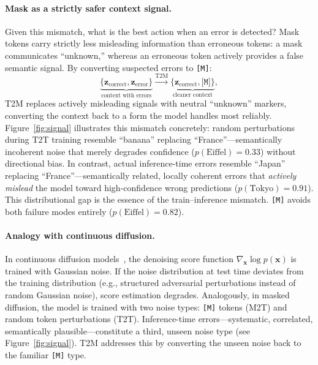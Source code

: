 \documentclass{article}
\newcommand{\mask}{\texttt{[M]}}
\newcommand{\MtoT}{\textrm{M2T}}
\newcommand{\TtoT}{\textrm{T2T}}
\newcommand{\TtoM}{\textrm{T2M}}
\begin{document}
\paragraph{Mask as a strictly safer context signal.} Given this mismatch, what is the best action when an error is detected? Mask tokens carry strictly less misleading information than erroneous tokens: a mask communicates ``unknown,'' whereas an erroneous token actively provides a false semantic signal. By converting suspected errors to \mask{}:
\begin{equation}
    \underbrace{\{\mathbf{z}_{\text{correct}}, \mathbf{z}_{\text{error}}\}}_{\text{context with errors}} \xrightarrow{\text{T2M}} \underbrace{\{\mathbf{z}_{\text{correct}}, \mask{}\}}_{\text{cleaner context}},
\end{equation}
\TtoM{} replaces actively misleading signals with neutral ``unknown'' markers, converting the context back to a form the model handles most reliably. Figure~\ref{fig:signal} illustrates this mismatch concretely: random perturbations during \TtoT{} training resemble ``banana'' replacing ``France''---semantically incoherent noise that merely degrades confidence ($p(\text{Eiffel}){=}0.33$) without directional bias. In contrast, actual inference-time errors resemble ``Japan'' replacing ``France''---semantically related, locally coherent errors that \emph{actively mislead} the model toward high-confidence wrong predictions ($p(\text{Tokyo}){=}0.91$). This distributional gap is the essence of the train--inference mismatch. \mask{} avoids both failure modes entirely ($p(\text{Eiffel}){=}0.82$).

\paragraph{Analogy with continuous diffusion.} In continuous diffusion models~\citep{ho2020ddpm,song2021scorebased}, the denoising score function $\nabla_{\mathbf{x}} \log p(\mathbf{x})$ is trained with Gaussian noise. If the noise distribution at test time deviates from the training distribution (e.g., structured adversarial perturbations instead of random Gaussian noise), score estimation degrades. Analogously, in masked diffusion, the model is trained with two noise types: \mask{} tokens (\MtoT{}) and random token perturbations (\TtoT{}). Inference-time errors---systematic, correlated, semantically plausible---constitute a third, unseen noise type (see Figure~\ref{fig:signal}). \TtoM{} addresses this by converting the unseen noise back to the familiar \mask{} type.
\end{document}
